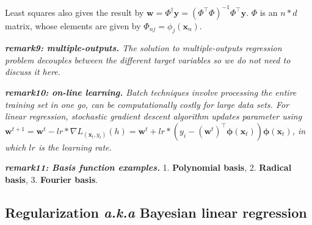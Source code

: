 \documentclass{article}
\begin{document}
	Least squares also gives the result by $\mathbf{w} = \Phi^\dag \mathbf{y} = (\Phi^\top \Phi)^{-1} \Phi^\top \mathbf{y}$. $\Phi$ is an $n*d$ matrix, whose elements are given by $\Phi_{nj} = \phi_j(\mathbf{x}_n)$.

	\begin{framed}
	\begin{scriptsize}
	\begin{spacing}{1.2}
	\noindent\textit{\textbf{remark9: multiple-outputs.} The solution to multiple-outputs regression problem decouples between the different target variables so we do not need to discuss it here.}
	
	\noindent\textit{\textbf{remark10: on-line learning.} Batch techniques involve processing the entire training set in one go, can be computationally costly for large data sets. For linear regression, stochastic gradient descent algorithm updates parameter using $\mathbf{w}^{t+1}=\mathbf{w}^{t} - lr*\nabla L_{(\mathbf{x}_t,y_t)}(h) = \mathbf{w}^{t} + lr* (y_i - (\mathbf{w}^t)^\top \mathbf{\phi} (\mathbf{x}_t)) \mathbf{\phi} (\mathbf{x}_t)$, in which $lr$ is the learning rate.}

	\noindent\textit{\textbf{remark11: Basis function examples.}} 1. \textbf{Polynomial basis}, 2. \textbf{Radical basis}, 3. \textbf{Fourier basis}.
	
	\end{spacing}
	\end{scriptsize}
	\end{framed}
	
	\subsection{Regularization \textit{a.k.a} Bayesian linear regression}
	
\end{document}
